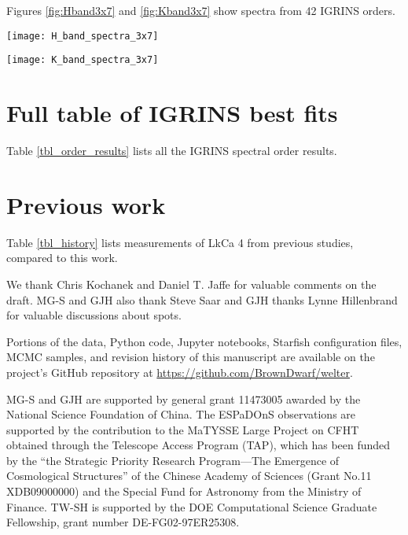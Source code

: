 \documentclass[twocolumn]{emulateapj}%
\newcommand{\name}{LkCa 4 }
\begin{document}
Figures \ref{fig:Hband3x7} and \ref{fig:Kband3x7} show spectra from 42 IGRINS orders.


\begin{figure*}
 \centering
 \texttt{[image: H\_band\_spectra\_3x7]}
 \caption{IGRINS Orders $122-100$, with panels arranged with the shortest wavelength in the upper left corner with central wavelength decreasing toward the bottom of the leftmost column, then decreasing through the subsequent columns.  The $y-$axis is on a logarithmic scale.  The red line is the cool photosphere while the blue line is the hot photosphere.  The purple line is the composite mixture model.}
 \label{fig:Hband3x7}
\end{figure*}

\begin{figure*}
 \centering
 \texttt{[image: K\_band\_spectra\_3x7]}
 \caption{IGRINS Orders $93-73$, with the same layout, ordering, and colors as Figure \ref{fig:Hband3x7}. The $y-$axis is on a logarithmic scale.}
 \label{fig:Kband3x7}
\end{figure*}



\section{Full table of IGRINS best fits}

Table \ref{tbl_order_results} lists all the IGRINS spectral order results.
\LongTables


\section{Previous work}

Table \ref{tbl_history} lists measurements of \name from previous studies, compared to this work.



\acknowledgements

We thank Chris Kochanek and Daniel T. Jaffe for valuable comments on the draft.  MG-S and GJH also thank Steve Saar and GJH thanks Lynne Hillenbrand for valuable discussions about spots.

Portions of the data, Python code, Jupyter notebooks, Starfish configuration files, MCMC samples, and revision history of this manuscript are available on the project's GitHub repository at \url{https://github.com/BrownDwarf/welter}.

MG-S and GJH are supported by general grant 11473005 awarded by the National Science Foundation of China.   The ESPaDOnS observations are supported by the contribution to the MaTYSSE Large Project on CFHT obtained through the Telescope Access Program (TAP), which has been funded by the ``the Strategic Priority Research Program---The Emergence of Cosmological Structures'' of the Chinese Academy of Sciences (Grant No.11 XDB09000000) and the Special Fund for Astronomy from the Ministry of Finance. 
TW-SH is supported by the DOE Computational Science Graduate Fellowship, grant number DE-FG02-97ER25308.
\end{document}
